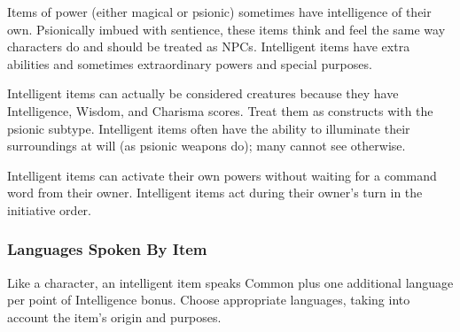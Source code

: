 Items of power (either magical or psionic) sometimes have intelligence of their own. Psionically imbued with sentience, these items think and feel the same way characters do and should be treated as NPCs. Intelligent items have extra abilities and sometimes extraordinary powers and special purposes.

Intelligent items can actually be considered creatures because they have Intelligence, Wisdom, and Charisma scores. Treat them as constructs with the psionic subtype. Intelligent items often have the ability to illuminate their surroundings at will (as psionic weapons do); many cannot see otherwise.

Intelligent items can activate their own powers without waiting for a command word from their owner. Intelligent items act during their owner's turn in the initiative order.



\subsubsection{Languages Spoken By Item}
Like a character, an intelligent item speaks Common plus one additional language per point of Intelligence bonus. Choose appropriate languages, taking into account the item's origin and purposes.









